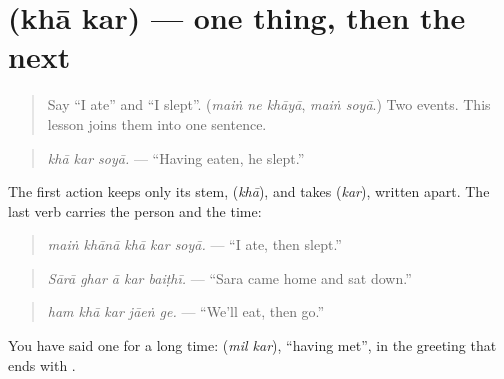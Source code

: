 \section[\texorpdfstring{\ur{کھا} \ur{کر} (khā kar)}{کھا کر (khā kar)}]{  (khā kar) — one thing, then the next}

\label{lesson:UR-C267-kha-kar}



\begin{quote}
Say \textquotedblleft{}I ate\textquotedblright{} and \textquotedblleft{}I slept\textquotedblright{}. (\emph{maiṅ ne khāyā}, \emph{maiṅ soyā}.) Two events. This lesson joins them into one sentence.
\end{quote}

\begin{grammarlens}[title={Grammar Lens: the stem and \ur{کر}}]
\begin{quote}
\textbf{  }
\end{quote}

\begin{quote}
\emph{khā kar soyā.} — \textquotedblleft{}Having eaten, he slept.\textquotedblright{}
\end{quote}

The first action keeps only its stem, \textbf{} (\emph{khā}), and takes \textbf{} (\emph{kar}), written apart. The last verb carries the person and the time:

\begin{quote}
\textbf{    }
\end{quote}

\begin{quote}
\emph{maiṅ khānā khā kar soyā.} — \textquotedblleft{}I ate, then slept.\textquotedblright{}
\end{quote}

\begin{quote}
\textbf{    }
\end{quote}

\begin{quote}
\emph{Sārā ghar ā kar baiṭhī.} — \textquotedblleft{}Sara came home and sat down.\textquotedblright{}
\end{quote}

\begin{quote}
\textbf{    }
\end{quote}

\begin{quote}
\emph{ham khā kar jāeṅ ge.} — \textquotedblleft{}We'll eat, then go.\textquotedblright{}
\end{quote}

You have said one for a long time: \textbf{ } (\emph{mil kar}), \textquotedblleft{}having met\textquotedblright{}, in the greeting that ends with \textbf{ }.
\end{grammarlens}

